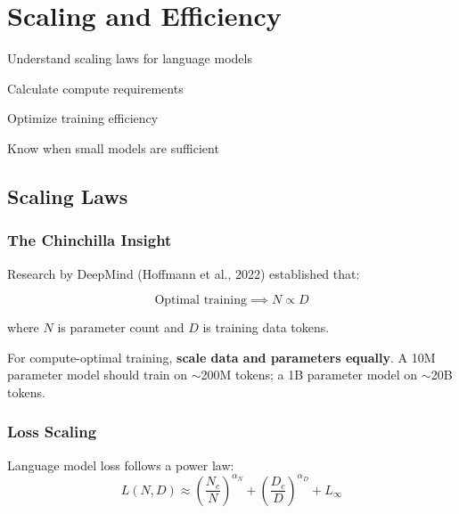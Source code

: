 \chapter{Scaling and Efficiency}
\label{ch:scaling-efficiency}

\begin{objectives}
    \item Understand scaling laws for language models
    \item Calculate compute requirements
    \item Optimize training efficiency
    \item Know when small models are sufficient
\end{objectives}

\section{Scaling Laws}

\subsection{The Chinchilla Insight}

Research by DeepMind (Hoffmann et al., 2022) established that:

\begin{equation}
\text{Optimal training} \implies N \propto D
\end{equation}

where $N$ is parameter count and $D$ is training data tokens.

\begin{keypoint}
For compute-optimal training, \textbf{scale data and parameters equally}. A 10M parameter model should train on $\sim$200M tokens; a 1B parameter model on $\sim$20B tokens.
\end{keypoint}

\subsection{Loss Scaling}

Language model loss follows a power law:
\begin{equation}
L(N, D) \approx \left(\frac{N_c}{N}\right)^{\alpha_N} + \left(\frac{D_c}{D}\right)^{\alpha_D} + L_\infty
\end{equation}

